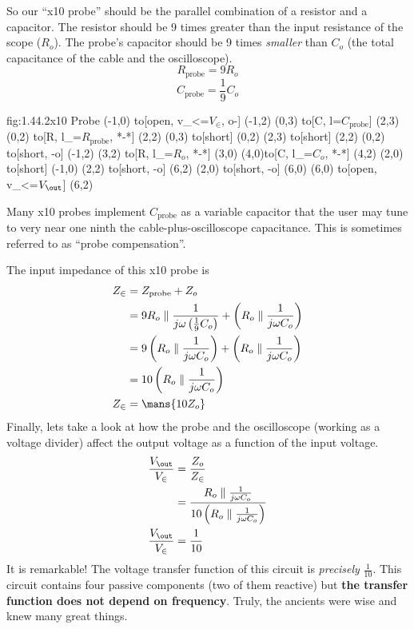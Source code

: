 So our ``x10 probe'' should be the parallel combination of a resistor and a capacitor.  The resistor should be 9 times greater than the input resistance of the scope ($R_o$).  The probe's capacitor should be 9 times \textit{smaller} than $C_o$ (the total capacitance of the cable and the oscilloscope).
\[R_{\text{probe}} = 9 R_o\]
\[C_{\text{probe}} = \frac{1}{9} C_o\]
\begin{circuit}{fig:1.44.2}{x10 Probe}
    (-1,0) to[open, v_<=$V_\in$, o-] (-1,2)
    (0,3) to[C, l=$C_{\text{probe}}$] (2,3)
    (0,2) to[R, l_=$R_{\text{probe}}$, *-*] (2,2)
    (0,3) to[short] (0,2)
    (2,3) to[short] (2,2)
    (0,2)  to[short, -o] (-1,2)
    (3,2) to[R, l_=$R_o$, *-*] (3,0)
    (4,0)to[C, l_=$C_o$, *-*] (4,2)
    (2,0) to[short] (-1,0)
    (2,2)  to[short, -o] (6,2)
    (2,0) to[short, -o] (6,0)
    (6,0) to[open, v_<=$V_\out$] (6,2)
\end{circuit}
Many x10 probes implement $C_{\text{probe}}$ as a variable capacitor that the user may tune to very near one ninth the cable-plus-oscilloscope capacitance.  This is sometimes referred to as ``probe compensation''.

The input impedance of this x10 probe is
\begin{align*}
    Z_{\in} &= Z_{\text{probe}} + Z_o \\
    &= 9 R_o \parallel \frac{1}{ j\omega \left( \frac{1}{9} C_o \right) } + \left( R_o \parallel \frac{1}{ j\omega C_o } \right) \\
    &= 9 \left( R_o \parallel \frac{1}{ j\omega C_o } \right) + \left( R_o \parallel \frac{1}{ j\omega C_o } \right) \\ 
    &= 10 \left( R_o \parallel \frac{1}{ j\omega C_o } \right) \\
    Z_{\in} &= \mans{ 10 Z_o }
\end{align*}
Finally, lets take a look at how the probe and the oscilloscope (working as a voltage divider) affect the output voltage as a function of the input voltage.
\begin{align*}
    \frac{V_{\out}}{V_{\in}} &= \frac{Z_o}{Z_{\in}} \\
    &= \frac{ R_o \parallel \frac{1}{ j\omega C_o } }{ 10 \left( R_o \parallel \frac{1}{ j\omega C_o } \right) } \\
    \frac{V_{\out}}{V_{\in}} &= \frac{1}{10}
\end{align*}
It is remarkable! The voltage transfer function of this circuit is \textit{precisely} $\frac{1}{10}$.  This circuit contains four passive components (two of them reactive) but \textbf{the transfer function does not depend on frequency}. Truly, the ancients were wise and knew many great things.



